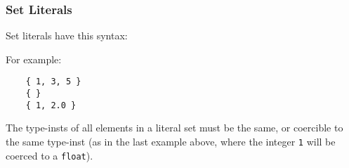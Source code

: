 \documentclass[10pt]{scrartcl}
\begin{document}
\subsubsection{Set Literals}
        \label{Set Literals}
Set literals have this syntax:
\begin{productions}
    \RuleSetLiteral
\end{productions}
For example:
\begin{verbatim}
    { 1, 3, 5 }
    { }
    { 1, 2.0 }
\end{verbatim}

The type-insts of all elements in a literal set must be the same, or
coercible to the same type-inst (as in the last example above, where the
integer \texttt{1} will be coerced to a \texttt{float}).

\end{document}

